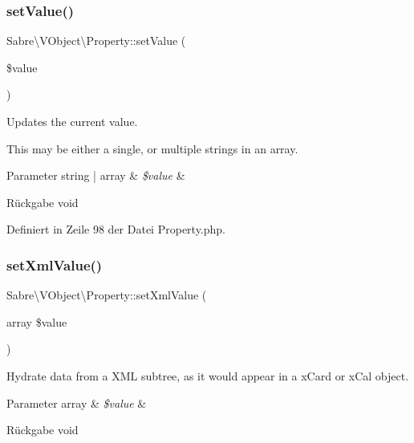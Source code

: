\subsubsection{\texorpdfstring{set\+Value()}{setValue()}}
{\footnotesize\ttfamily Sabre\textbackslash{}\+V\+Object\textbackslash{}\+Property\+::set\+Value (\begin{DoxyParamCaption}\item[{}]{\$value }\end{DoxyParamCaption})}

Updates the current value.

This may be either a single, or multiple strings in an array.


\begin{DoxyParams}[1]{Parameter}
string | array & {\em \$value} & \\
\hline
\end{DoxyParams}
\begin{DoxyReturn}{Rückgabe}
void 
\end{DoxyReturn}


Definiert in Zeile 98 der Datei Property.\+php.

\mbox{\label{class_sabre_1_1_v_object_1_1_property_ace4b8fee52c8ee7fecfaf7e35111af7e}} 
\subsubsection{\texorpdfstring{set\+Xml\+Value()}{setXmlValue()}}
{\footnotesize\ttfamily Sabre\textbackslash{}\+V\+Object\textbackslash{}\+Property\+::set\+Xml\+Value (\begin{DoxyParamCaption}\item[{array}]{\$value }\end{DoxyParamCaption})}

Hydrate data from a X\+ML subtree, as it would appear in a x\+Card or x\+Cal object.


\begin{DoxyParams}[1]{Parameter}
array & {\em \$value} & \\
\hline
\end{DoxyParams}
\begin{DoxyReturn}{Rückgabe}
void 
\end{DoxyReturn}


